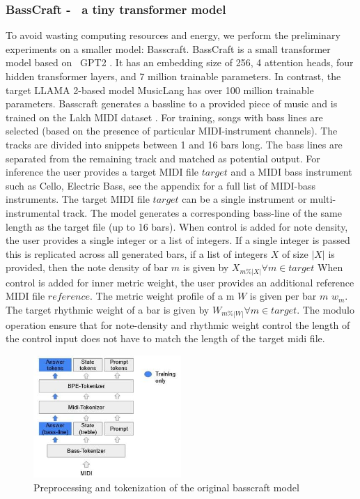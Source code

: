 \subsubsection{BassCraft -  a tiny transformer model}
To avoid wasting computing resources and energy, we perform the preliminary experiments on a smaller model: Basscraft. BassCraft is a small transformer model based on  GPT2 \cite{Radford_Wu_Child_Luan_gpt2_2019}. It has an embedding size of 256, 4 attention heads, four hidden transformer layers, and 7 million trainable parameters. In contrast, the target LLAMA 2-based model MusicLang has over 100 million trainable parameters. Basscraft generates a bassline to a provided piece of music and is trained on the Lakh MIDI dataset \cite{Raffel_2016}. For training, songs with bass lines are selected (based on the presence of particular MIDI-instrument channels). The tracks are divided into snippets between 1 and 16 bars long. The bass lines are separated from the remaining track and matched as potential output. 
 For inference the user provides a target MIDI file $target$ and a MIDI bass instrument such as Cello, Electric Bass, see the appendix for a full list of MIDI-bass instruments. The target MIDI file $target$ can be a single instrument or multi-instrumental track. The model generates a corresponding bass-line of the same length as the target file (up to 16 bars). When control is added for note density, the user provides a single integer or a list of integers. If a single integer is passed this is replicated across all generated bars, if a list of integers $X$ of size $|X|$ is provided, then the note density of bar $m$ is given by $X_{m\%|X|} \forall m \in target$
When control is added for inner metric weight, the user provides an additional reference MIDI file $reference$. The metric weight profile of a m $W$ is given per bar $m$ $w_{m}$. The target rhythmic weight of a bar is given by $W_{m\%|W|} \forall m \in target$. The modulo operation ensure that for note-density and rhythmic weight control the length of the control input does not have to match the length of the target midi file.    

\begin{figure}[H]
    \centering
    \includegraphics[width=0.5\textwidth]{IMAGES/Preprocessing1.jpg} 
    \caption{Preprocessing and tokenization of the original basscraft model}
    \label{fig:preprocessing1}
\end{figure}

